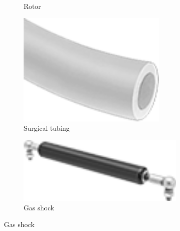\begin{figure}[H]
\begin{subfigure}[b]{.19\linewidth}
			\caption{Rotor}
		\end{subfigure}\begin{subfigure}[b]{.19\linewidth}
			\includegraphics[width=0.8\textwidth]{imgs/spring_elastic.png}
			\caption{Surgical tubing}
		\end{subfigure}\begin{subfigure}[b]{.19\linewidth}
			\includegraphics[width=0.9\textwidth]{imgs/spring_gasshock.png}
			\caption{Gas shock}
		\end{subfigure}
	\end{figure}
	

